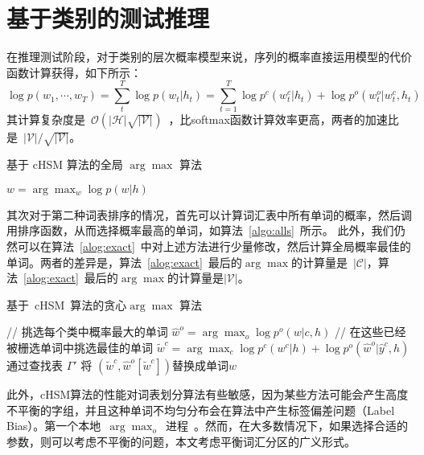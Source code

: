 \section{基于类别的测试推理}
在推理测试阶段，对于类别的层次概率模型来说，序列的概率直接运用模型的代价函数计算获得，如下所示：
\begin{equation}\label{equ:class_inf}
\log p(w_1,\cdots, w_T)=\sum_t^T\log p(w_t|h_t) =\sum_{t=1}^{T}\log p^c(w^c_t|h_t) +\log p^o(w^o_t|w^c_t,h_t)
\end{equation}
其计算复杂度是~$\mathcal{O(|H|\sqrt{|\mathcal{V}|})}$~，比softmax函数计算效率更高，两者的加速比是~$|\mathcal{V}|/\sqrt{|\mathcal{V}|}$。

\begin{algorithm}[!ht]
\caption{基于 cHSM 算法的全局 $\arg\max$ 算法}\label{algo:alls}
 {$w=\arg\max_w \log p(w|h)$}\;
\end{algorithm}

其次对于第二种词表排序的情况，首先可以计算词汇表中所有单词的概率，然后调用排序函数，从而选择概率最高的单词，如算法~\ref{algo:alls}~所示。 此外，我们仍然可以在算法~\ref{alog:exact}~中对上述方法进行少量修改，然后计算全局概率最佳的单词。两者的差异是，算法~\ref{alog:exact}~最后的$\arg\max$的计算量是~$\mathcal{|C|}$，算法~\ref{alog:exact}~最后的$\arg\max$的计算量是$\mathcal{|V|}$。
\begin{algorithm}[!t]
\caption{基于~cHSM~算法的贪心$\arg\max$ 算法}\label{alog:exact}
{// 挑选每个类中概率最大的单词}\;
 {$\hat w^o=\arg\max_o{\log p^o(w| c,h)}$ }\;
 {// 在这些已经被栅选单词中挑选最佳的单词}
 {$\tilde w^c=\arg\max_c{\log p^c(w^c|h)+\log p^o(\hat w^o|\hat y^c,h)}$}\;
通过查找表 $\Gamma'$ 将 $(\tilde w^c,\hat w^o[\tilde w^c])$替换成单词$w$ \;
\end{algorithm}


此外，cHSM算法的性能对词表划分算法有些敏感，因为某些方法可能会产生高度不平衡的字组，并且这种单词不均匀分布会在算法中产生标签偏差问题（Label Bias）。第一个本地~$\arg\max_o$~进程~。然而，在大多数情况下，如果选择合适的参数，则可以考虑不平衡的问题，本文考虑平衡词汇分区的广义形式。

